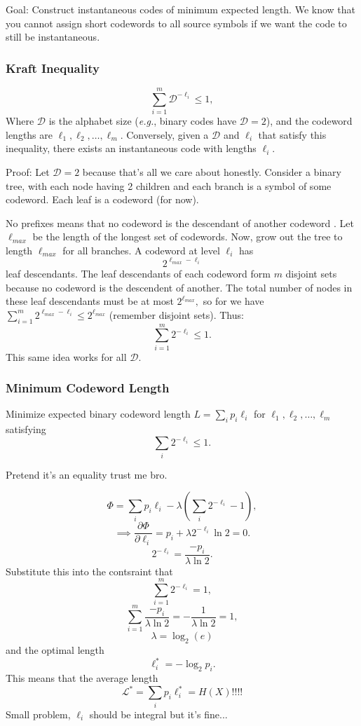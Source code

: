 \documentclass[12pt]{article}
\begin{document}
Goal: Construct instantaneous codes of minimum expected length. 
We know that you cannot assign short codewords to all source symbols if we want the code to still be instantaneous.

\subsubsection{Kraft Inequality}
\[\sum_{i=1}^m \mathcal{D}^{-\ell_i}\le 1,\]
Where $\mathcal{D}$ is the alphabet size (\textit{e.g.}, binary codes have $\mathcal{D}=2$), and the codeword lengths are $\ell_1,\ell_2,\dots,\ell_m.$ Conversely, given a $\mathcal{D}$ and $\ell_i$ that satisfy this inequality, there exists an instantaneous code with lengths $\ell_i.$

Proof:
Let $\mathcal{D}=2$ because that's all we care about honestly.
Consider a binary tree, with each node having 2 children and each branch is a symbol of some codeword. Each leaf is a codeword (for now).


No prefixes means that no codeword is the descendant of another codeword . Let $\ell_{max}$ be the length of the longest set of codewords. Now, grow out the tree to length $\ell_{max}$ for all branches.
A codeword at level $\ell_i$ has
\[2^{\ell_{max}-\ell_i}\] leaf descendants. The leaf descendants of each codeword form $m$ disjoint sets because no codeword is the descendent of another. The total number of nodes in these leaf descendants must be at most $2^{\ell_{max}},$ so for we have $\sum_{i=1}^m 2^{\ell_{max}-\ell_i} \le 2^{\ell_{max}}$ (remember disjoint sets). Thus:
\[\sum_{i=1}^m2^{-\ell_i}\le 1.\] This same idea works for all $\mathcal{D}.$

\subsubsection{Minimum Codeword Length}
Minimize expected binary codeword length $L=\sum_i p_i\ell_i$ for $\ell_1,\ell_2,\dots,\ell_m$ satisfying 
\[\sum_i 2^{-\ell_i}\le 1.\]

Pretend it's an equality trust me bro.

\[\Phi=\sum_i p_i\ell_i-\lambda\left(\sum_i 2^{-\ell_i}-1\right),\]
\[\implies \frac{\partial\Phi}{\partial\ell_i}=p_i+\lambda 2^{-\ell_i}\ln2=0.\]
\[2^{-\ell_i}=\frac{-p_i}{\lambda\ln 2}.\] Substitute this into the contsraint that
\[\sum_{i=1}^m 2^{-\ell_i}=1,\]
\[\sum_{i=1}^m\frac{-p_i}{\lambda\ln 2}=-\frac{1}{\lambda\ln 2}=1,\]
\[\lambda=\log_2(e)\] and the optimal length
\[\ell_i^\ast=-\log_2 p_i.\]
This means that the average length
\[\mathcal{L}^\ast=\sum_i p_i\ell_i^\ast=H(X)!!!!\] Small problem, $\ell_i$ should be integral but it's fine...
\end{document}
